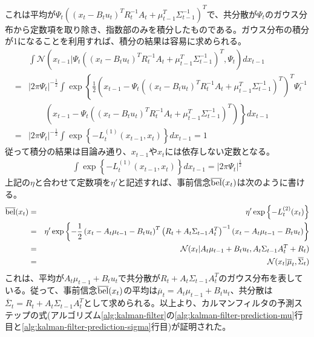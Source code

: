 \documentclass[dvipdfmx,a4paper]{jsarticle}
\begin{document}
これは平均が$\Psi_t \left( \left( x_t - B_t u_t \right)^T R_t^{-1} A_t + \mu_{t - 1}^T \Sigma_{t - 1}^{-1} \right)^T$で、共分散が$\Psi_t$のガウス分布から定数項を取り除き、指数部のみを積分したものである。ガウス分布の積分が1になることを利用すれば、積分の結果は容易に求められる。
\begin{eqnarray}
	&& \int \mathcal{N} \left( x_{t - 1} | \Psi_t \left( \left( x_t - B_t u_t \right)^T R_t^{-1} A_t + \mu_{t - 1}^T \Sigma_{t - 1}^{-1} \right)^T, \Psi_t \right) dx_{t - 1} \nonumber \\
	&=& |2 \pi \Psi_t|^{-\frac{1}{2}} \int \exp \left\{ \frac{1}{2} \left( x_{t - 1} - \Psi_t \left( \left( x_t - B_t u_t \right)^T R_t^{-1} A_t + \mu_{t - 1}^T \Sigma_{t - 1}^{-1} \right)^T \right)^T \Psi_t^{-1} \right. \nonumber \\
	&& \qquad \left. \left( x_{t - 1} - \Psi_t \left( \left( x_t - B_t u_t \right)^T R_t^{-1} A_t + \mu_{t - 1}^T \Sigma_{t - 1}^{-1} \right)^T \right) \right\} dx_{t - 1} \nonumber \\
	&=& |2 \pi \Psi_t|^{-\frac{1}{2}} \int \exp \left\{ -L_t^{(1)}(x_{t - 1}, x_t) \right\} dx_{t - 1} = 1
\end{eqnarray}
従って積分の結果は目論み通り、$x_{t - 1}$や$x_t$には依存しない定数となる。
\begin{eqnarray}
	\int \exp \left\{ -L_t^{(1)}(x_{t - 1}, x_t) \right\} dx_{t - 1} = |2 \pi \Psi_t|^\frac{1}{2}
\end{eqnarray}
上記の$\eta$と合わせて定数項を$\eta'$と記述すれば、事前信念$\operatorname{\overline{bel}}(x_t)$は次のように書ける。
\begin{eqnarray}
	\operatorname{\overline{bel}}(x_t) &=& \eta' \exp \left\{ -L_t^{(2)}(x_t) \right\} \nonumber \\
	&=& \eta' \exp \left\{ -\frac{1}{2} \left( x_t - A_t \mu_{t - 1} - B_t u_t \right)^T \left( R_t + A_t \Sigma_{t - 1} A_t^T \right)^{-1} \left( x_t - A_t \mu_{t - 1} - B_t u_t \right) \right\} \\
	&=& \mathcal{N}(x_t | A_t \mu_{t - 1} + B_t u_t, A_t \Sigma_{t - 1} A_t^T + R_t) \\
	&=& \mathcal{N}(x_t | \overline{\mu}_t, \overline{\Sigma}_t)
\end{eqnarray}
これは、平均が$A_t \mu_{t - 1} + B_t u_t$で共分散が$R_t + A_t \Sigma_{t - 1} A_t^T$のガウス分布を表している。従って、事前信念$\operatorname{\overline{bel}}(x_t)$の平均は$\overline{\mu}_t = A_t \mu_{t - 1} + B_t u_t$、共分散は$\overline{\Sigma}_t = R_t + A_t \Sigma_{t - 1} A_t^T$として求められる。以上より、カルマンフィルタの予測ステップの式(アルゴリズム\ref{alg:kalman-filter}の\ref{alg:kalman-filter-prediction-mu}行目と\ref{alg:kalman-filter-prediction-sigma}行目)が証明された。
\end{document}
